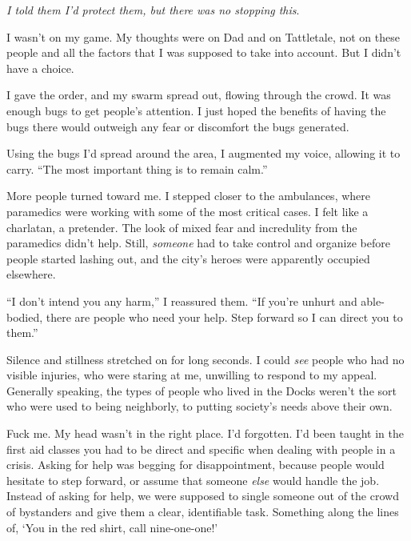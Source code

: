 \emph{I told them I'd protect them, but there was no stopping this}.



I wasn't on my game.  My thoughts were on Dad and on Tattletale, not on these people and all the factors that I was supposed to take into account.  But I didn't have a choice.



I gave the order, and my swarm spread out, flowing through the crowd.  It was enough bugs to get people's attention.  I just hoped the benefits of having the bugs there would outweigh any fear or discomfort the bugs generated.



Using the bugs I'd spread around the area, I augmented my voice, allowing it to carry.  ``The most important thing is to remain calm.''



More people turned toward me.  I stepped closer to the ambulances, where paramedics were working with some of the most critical cases.  I felt like a charlatan, a pretender.  The look of mixed fear and incredulity from the paramedics didn't help.  Still, \emph{someone} had to take control and organize before people started lashing out, and the city's heroes were apparently occupied elsewhere.



``I don't intend you any harm,'' I reassured them.  ``If you're unhurt and able-bodied, there are people who need your help.  Step forward so I can direct you to them.''



Silence and stillness stretched on for long seconds.  I could \emph{see} people who had no visible injuries, who were staring at me, unwilling to respond to my appeal.  Generally speaking, the types of people who lived in the Docks weren't the sort who were used to being neighborly, to putting society's needs above their own.



Fuck me.  My head wasn't in the right place.  I'd forgotten.  I'd been taught in the first aid classes you had to be direct and specific when dealing with people in a crisis.  Asking for help was begging for disappointment, because people would hesitate to step forward, or assume that someone \emph{else} would handle the job.  Instead of asking for help, we were supposed to single someone out of the crowd of bystanders and give them a clear, identifiable task.  Something along the lines of, `You in the red shirt, call nine-one-one!'



